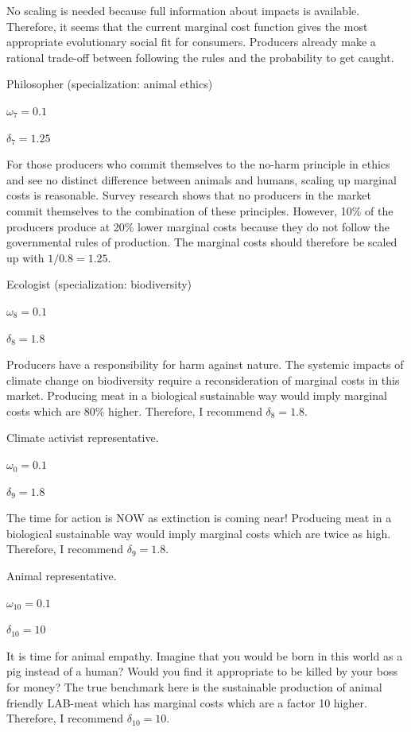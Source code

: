 \documentclass[
]{book}
\begin{document}
No scaling is needed because full information about impacts is available. Therefore, it seems that the current marginal cost function gives the most appropriate evolutionary social fit for consumers. Producers already make a rational trade-off between following the rules and the probability to get caught.

Philosopher (specialization: animal ethics)

\(\omega_7 = 0.1\)

\(\delta_7 = 1.25\)

For those producers who commit themselves to the no-harm principle in ethics and see no distinct difference between animals and humans, scaling up marginal costs is reasonable. Survey research shows that no producers in the market commit themselves to the combination of these principles. However, 10\% of the producers produce at 20\% lower marginal costs because they do not follow the governmental rules of production. The marginal costs should therefore be scaled up with \(1/0.8=1.25\).

Ecologist (specialization: biodiversity)

\(\omega_8 = 0.1\)

\(\delta_8 = 1.8\)

Producers have a responsibility for harm against nature. The systemic impacts of climate change on biodiversity require a reconsideration of marginal costs in this market. Producing meat in a biological sustainable way would imply marginal costs which are 80\% higher. Therefore, I recommend
\(\delta_8=1.8\).

Climate activist representative.

\(\omega_0 = 0.1\)

\(\delta_9 = 1.8\)

The time for action is NOW as extinction is coming near! Producing meat in a biological sustainable way would imply marginal costs which are twice as high. Therefore, I recommend \(\delta_9=1.8\).

Animal representative.

\(\omega_{10} = 0.1\)

\(\delta_{10} = 10\)

It is time for animal empathy. Imagine that you would be born in this world as a pig instead of a human? Would you find it appropriate to be killed by your boss for money? The true benchmark here is the sustainable production of animal friendly LAB-meat which has marginal costs which are a factor 10 higher. Therefore, I recommend \(\delta_10=10\).
\end{document}
